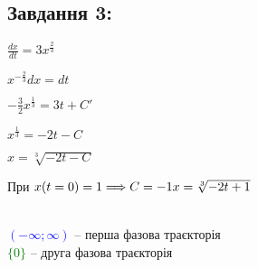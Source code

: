 \subsection{Завдання 3:}

\begin{minipage}{0.49\textwidth}
    $\frac{dx}{dt} = 3x^{\frac{2}{3}}$

    $x^{-\frac{2}{3}}dx = dt$

    $-\frac{3}{2}x^{\frac{1}{3}} = 3t + C'$

    $x^{\frac{1}{3}} = -2t - C$

    $x = \sqrt[3]{-2t - C}$

    При $x(t = 0) = 1 \Longrightarrow C = -1\\
    x = \sqrt[3]{-2t + 1}$

\end{minipage}
\begin{minipage}{0.49\textwidth}
    \centering \resizebox*{7cm}{7cm}{}\\
    \textcolor{blue}{$(-\infty;\infty)$} -- перша фазова траєкторія\\
    \textcolor{green}{$\{0\}$} -- друга фазова траєкторія
\end{minipage}